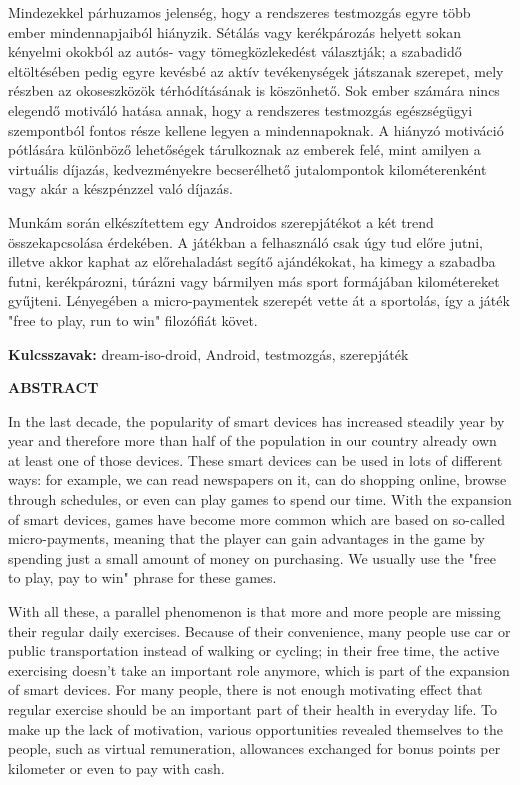 \documentclass[a4paper,oneside,10pt]{report}
\begin{document}
Mindezekkel párhuzamos jelenség, hogy a rendszeres testmozgás egyre több ember mindennapjaiból hiányzik.
Sétálás vagy kerékpározás helyett sokan kényelmi okokból az autós- vagy tömegközlekedést választják; a szabadidő eltöltésében pedig egyre kevésbé az aktív tevékenységek játszanak szerepet, mely részben az okoseszközök térhódításának is köszönhető.
Sok ember számára nincs elegendő motiváló hatása annak, hogy a rendszeres testmozgás egészségügyi szempontból fontos része kellene legyen a mindennapoknak. 
A hiányzó motiváció pótlására különböző lehetőségek tárulkoznak az emberek felé, mint amilyen a virtuális díjazás, kedvezményekre becserélhető jutalompontok kilométerenként vagy akár a készpénzzel való díjazás. 

Munkám során elkészítettem egy Androidos szerepjátékot a két trend összekapcsolása érdekében. 
A játékban a felhasználó csak úgy tud előre jutni, illetve akkor kaphat az előrehaladást segítő ajándékokat, ha kimegy a szabadba futni, kerékpározni, túrázni vagy bármilyen más sport formájában kilométereket gyűjteni. 
Lényegében a micro-paymentek szerepét vette át a sportolás, így a játék "free to play, run to win" filozófiát követ.


\textbf{Kulcsszavak:} dream-iso-droid, Android, testmozgás, szerepjáték

\newpage

\Large
\begin{center}
	\textbf{ABSTRACT}
\end{center}
\normalsize
\noindent
In the last decade, the popularity of smart devices has increased steadily year by year and therefore more than half of the population in our country already own at least one of those devices.
These smart devices can be used in lots of different ways: for example, we can read newspapers on it, can do shopping online, browse through schedules, or even can play games to spend our time.
With the expansion of smart devices, games have become more common which are based on so-called micro-payments, meaning that the player can gain advantages in the game by spending just a small amount of money on purchasing. We usually use the "free to play, pay to win" phrase for these games.

With all these, a parallel phenomenon is that more and more people are missing their regular daily exercises. 
Because of their convenience, many people use car or public transportation instead of walking or cycling; in their free time, the active exercising doesn’t take an important role anymore, which is part of the expansion of smart devices.
For many people, there is not enough motivating effect that regular exercise should be an important part of their health in everyday life.
To make up the lack of motivation, various opportunities revealed themselves to the people, such as virtual remuneration, allowances exchanged for bonus points per kilometer or even to pay with cash.
\end{document}
